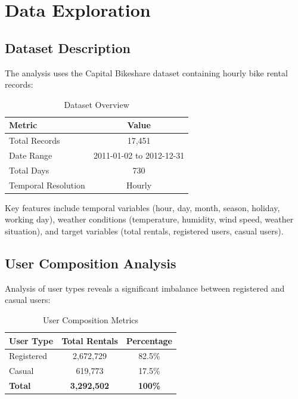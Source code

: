 \documentclass[12pt,a4paper]{article}
\begin{document}
\section{Data Exploration}

\subsection{Dataset Description}

The analysis uses the Capital Bikeshare dataset containing hourly bike rental records:

\begin{table}[H]
\centering
\caption{Dataset Overview}
\begin{tabular}{lc}
\toprule
\textbf{Metric} & \textbf{Value} \\
\midrule
Total Records & 17,451 \\
Date Range & 2011-01-02 to 2012-12-31 \\
Total Days & 730 \\
Temporal Resolution & Hourly \\
\bottomrule
\end{tabular}
\label{tab:dataset}
\end{table}

Key features include temporal variables (hour, day, month, season, holiday, working day), weather conditions (temperature, humidity, wind speed, weather situation), and target variables (total rentals, registered users, casual users).

\subsection{User Composition Analysis}

Analysis of user types reveals a significant imbalance between registered and casual users:

\begin{table}[H]
\centering
\caption{User Composition Metrics}
\begin{tabular}{lcc}
\toprule
\textbf{User Type} & \textbf{Total Rentals} & \textbf{Percentage} \\
\midrule
Registered & 2,672,729 & 82.5\% \\
Casual & 619,773 & 17.5\% \\
\midrule
\textbf{Total} & \textbf{3,292,502} & \textbf{100\%} \\
\bottomrule
\end{tabular}
\label{tab:users}
\end{table}
\end{document}
